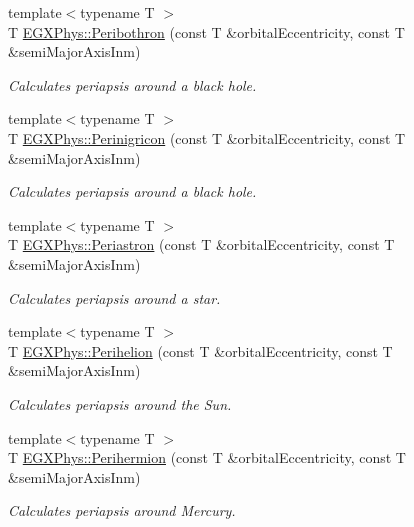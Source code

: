 \begin{DoxyCompactItemize}
{\footnotesize template$<$typename T $>$ }\\T \mbox{\hyperlink{group___e_g_x_phys-_periapsis_gad43bb3a6be82521d41d7a55453dec47e}{E\+G\+X\+Phys\+::\+Peribothron}} (const T \&orbital\+Eccentricity, const T \&semi\+Major\+Axis\+Inm)
\begin{DoxyCompactList}\small\item\em Calculates periapsis around a black hole. \end{DoxyCompactList}\item 
{\footnotesize template$<$typename T $>$ }\\T \mbox{\hyperlink{group___e_g_x_phys-_periapsis_ga2de34009308e46d1d3bd4eb8cd4b0a8d}{E\+G\+X\+Phys\+::\+Perinigricon}} (const T \&orbital\+Eccentricity, const T \&semi\+Major\+Axis\+Inm)
\begin{DoxyCompactList}\small\item\em Calculates periapsis around a black hole. \end{DoxyCompactList}\item 
{\footnotesize template$<$typename T $>$ }\\T \mbox{\hyperlink{group___e_g_x_phys-_periapsis_gaf3c623561998f107496fb7341698ae9d}{E\+G\+X\+Phys\+::\+Periastron}} (const T \&orbital\+Eccentricity, const T \&semi\+Major\+Axis\+Inm)
\begin{DoxyCompactList}\small\item\em Calculates periapsis around a star. \end{DoxyCompactList}\item 
{\footnotesize template$<$typename T $>$ }\\T \mbox{\hyperlink{group___e_g_x_phys-_periapsis_ga10f870e17f51680c5df8731c1a7848cf}{E\+G\+X\+Phys\+::\+Perihelion}} (const T \&orbital\+Eccentricity, const T \&semi\+Major\+Axis\+Inm)
\begin{DoxyCompactList}\small\item\em Calculates periapsis around the Sun. \end{DoxyCompactList}\item 
{\footnotesize template$<$typename T $>$ }\\T \mbox{\hyperlink{group___e_g_x_phys-_periapsis_ga4e2090fddafea2fca70acd6f7a1eddc4}{E\+G\+X\+Phys\+::\+Perihermion}} (const T \&orbital\+Eccentricity, const T \&semi\+Major\+Axis\+Inm)
\begin{DoxyCompactList}\small\item\em Calculates periapsis around Mercury. \end{DoxyCompactList}\item 

\end{DoxyCompactItemize}
